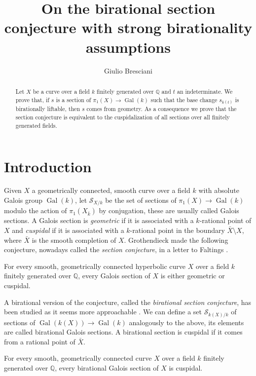 \documentclass[11pt]{amsart}
\title{On the birational section conjecture with strong birationality assumptions}
\date{}
\author{Giulio Bresciani}
\theoremstyle{plain}
\theoremstyle{definition}
\newcommand{\on}{\operatorname}
\newcommand{\1}{\mathbb{1}}
\newcommand{\gal}{\on{Gal}}
\newcommand{\mc}{\mathcal}
\newcommand{\Q}{\mathbb{Q}}
\begin{document}
\begin{abstract}
	Let $X$ be a curve over a field $k$ finitely generated over $\mathbb{Q}$ and $t$ an indeterminate. We prove that, if $s$ is a section of $\pi_{1}(X)\to\operatorname{Gal}(k)$ such that the base change $s_{k(t)}$ is birationally liftable, then $s$ comes from geometry. As a consequence we prove that the section conjecture is equivalent to the cuspidalization of all sections over all finitely generated fields.
\end{abstract}

\maketitle

\section{Introduction}



Given $X$ a geometrically connected, smooth curve over a field $k$ with absolute Galois group $\gal(k)$, let $\mc{S}_{X/k}$ be the set of sections of $\pi_{1}(X)\to\gal(k)$ modulo the action of $\pi_{1}(X_{\bar{k}})$ by conjugation, these are usually called Galois sections. A Galois section is \emph{geometric} if it is associated with a $k$-rational point of $X$ and \emph{cuspidal} if it is associated with a $k$-rational point in the boundary $\bar{X}\setminus X$, where $\bar{X}$ is the smooth completion of $X$. Grothendieck made the following conjecture, nowadays called the \emph{section conjecture}, in a letter to Faltings \cite{gro97}.

\begin{SC}
    For every smooth, geometrically connected hyperbolic curve $X$ over a field $k$ finitely generated over $\Q$, every Galois section of $X$ is either geometric or cuspidal.
\end{SC}

A birational version of the conjecture, called the \emph{birational section conjecture}, has been studied as it seems more approachable \cite{koe05} \cite{sti15} \cite{saty21}. We can define a set $\mc{S}_{k(X)/k}$ of sections of $\gal(k(X))\to\gal(k)$ analogously to the above, its elements are called birational Galois sections. A birational section is cuspidal if it comes from a rational point of $\bar{X}$.

\begin{BSC}
    For every smooth, geometrically connected curve $X$ over a field $k$ finitely generated over $\Q$, every birational Galois section of $X$ is cuspidal.
\end{BSC}
\end{document}
